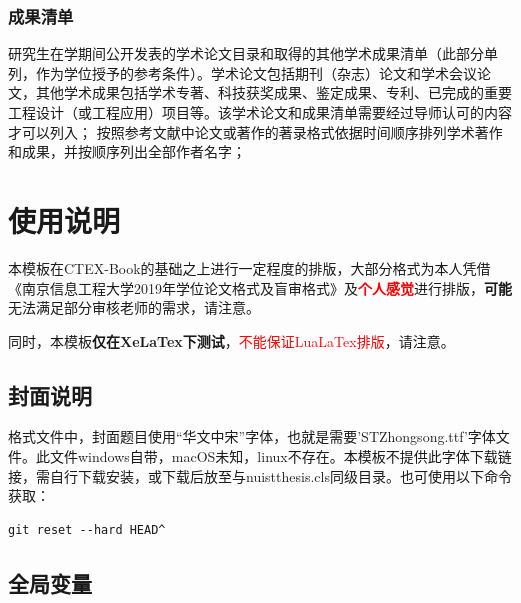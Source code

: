 \documentclass{nuistthesis}
\begin{document}
\subsection{成果清单}

研究生在学期间公开发表的学术论文目录和取得的其他学术成果清单（此部分单列，作为学位授予的参考条件）。学术论文包括期刊（杂志）论文和学术会议论文，其他学术成果包括学术专著、科技获奖成果、鉴定成果、专利、已完成的重要工程设计（或工程应用）项目等。该学术论文和成果清单需要经过导师认可的内容才可以列入；
按照参考文献中论文或著作的著录格式依据时间顺序排列学术著作和成果，并按顺序列出全部作者名字；


\chapter{使用说明}

本模板在CTEX-Book的基础之上进行一定程度的排版，大部分格式为本人凭借《南京信息工程大学\hspace{1em}2019年学位论文格式及盲审格式》\cite{NUIST_thesis}及\textcolor{red}{\bfseries 个人感觉}进行排版，{\bfseries 可能}无法满足部分审核老师的需求，请注意。

同时，本模板{\bfseries 仅在XeLaTex下测试}，\textcolor{red}{不能保证LuaLaTex排版}，请注意。

\section{封面说明}

格式文件中，封面题目使用“华文中宋”字体，也就是需要'STZhongsong.ttf'字体文件。此文件windows自带，macOS未知，linux不存在。本模板不提供此字体下载链接，需自行下载安装，或下载后放至与nuistthesis.cls同级目录。也可使用以下命令获取：

\begin{lstlisting}
git reset --hard HEAD^
\end{lstlisting}


\section{全局变量}
\end{document}
